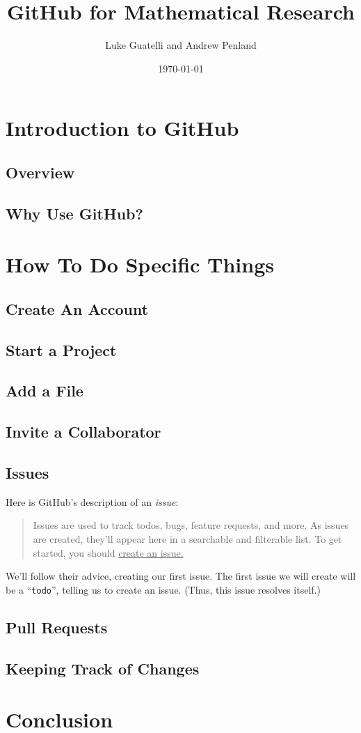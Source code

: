 \documentclass[11pt]{article}
\title{GitHub for Mathematical Research}
\author{Luke Guatelli and Andrew Penland}
\date{\today}
\begin{document}
\maketitle

\section{Introduction to GitHub}

\subsection{Overview}

\subsection{Why Use GitHub?}

\section{How To Do Specific Things}

\subsection{Create An Account}

\subsection{Start a Project}

\subsection{Add a File}

\subsection{Invite a Collaborator} 

\subsection{Issues}

Here is GitHub's description of an \textit{issue}:~\cite{github-issues} \\

\begin{quote}
Issues are used to track todos, bugs, feature requests, and more. As issues are created, they'll appear here in a searchable and filterable list. To get started, you should \underline{create an issue.}
\end{quote} 

We'll follow their advice, creating our first issue. The first issue we will create will be a ``\texttt{todo}'', telling us to create an issue. (Thus, this issue resolves itself.) 



\subsection{Pull Requests}

\subsection{Keeping Track of Changes}

\section{Conclusion}
\end{document}
